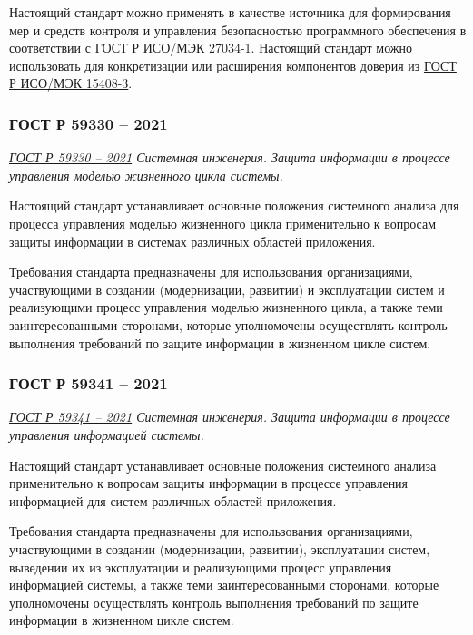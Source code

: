 Настоящий стандарт можно применять в качестве источника для формирования мер
и средств контроля и управления безопасностью программного обеспечения
в соответствии с
\href{https://docs.cntd.ru/document/1200112883}{ГОСТ Р ИСО/МЭК 27034-1}.
Настоящий стандарт можно использовать для конкретизации
или расширения компонентов доверия из
\href{https://docs.cntd.ru/document/1200105711}{ГОСТ Р ИСО/МЭК 15408-3}.

\subsubsection{ГОСТ Р 59330 -- 2021}

\emph{\href{https://docs.cntd.ru/document/1200179342}{ГОСТ Р 59330 -- 2021}
Системная инженерия.
Защита информации в процессе управления моделью жизненного цикла системы.
}

Настоящий стандарт устанавливает основные положения системного анализа
для процесса управления моделью жизненного цикла применительно
к вопросам защиты информации в системах различных областей приложения.

Требования стандарта предназначены для использования организациями,
участвующими в создании (модернизации, развитии) и эксплуатации систем
и реализующими процесс управления моделью жизненного цикла,
а также теми заинтересованными сторонами,
которые уполномочены осуществлять контроль выполнения требований
по защите информации в жизненном цикле систем.

\subsubsection{ГОСТ Р 59341 -- 2021}

\emph{\href{https://docs.cntd.ru/document/1200179545}{ГОСТ Р 59341 -- 2021}
Системная инженерия.
Защита информации в процессе управления информацией системы.
}

Настоящий стандарт устанавливает основные положения
системного анализа применительно к вопросам защиты информации
в процессе управления информацией для систем различных областей приложения.

Требования стандарта предназначены для использования организациями,
участвующими в создании (модернизации, развитии),
эксплуатации систем, выведении их из эксплуатации
и реализующими процесс управления информацией системы,
а также теми заинтересованными сторонами,
которые уполномочены осуществлять контроль выполнения требований
по защите информации в жизненном цикле систем.

